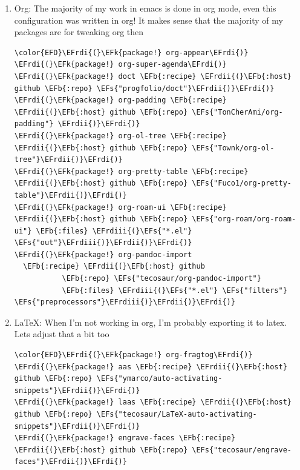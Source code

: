 \documentclass{scrartcl}
\newcommand{\EFk}[1]{\textcolor{EFk}{#1}} %
\newcommand{\EFs}[1]{\textcolor{EFs}{#1}} %
\newcommand{\EFb}[1]{\textcolor{EFb}{#1}} %
\newcommand{\EFrdi}[1]{\textcolor{EFrdi}{#1}} %
\newcommand{\EFrdii}[1]{\textcolor{EFrdii}{#1}} %
\newcommand{\EFrdiii}[1]{\textcolor{EFrdiii}{#1}} %
\begin{document}
\begin{enumerate}
\item Org:
\label{sec:orge8de331}
The majority of my work in emacs is done in org mode, even this configuration
was written in org! It makes sense that the majority of my packages are for
tweaking org then
\begin{Code}
\begin{Verbatim}[]
\color{EFD}\EFrdi{(}\EFk{package!} org-appear\EFrdi{)}
\EFrdi{(}\EFk{package!} org-super-agenda\EFrdi{)}
\EFrdi{(}\EFk{package!} doct \EFb{:recipe} \EFrdii{(}\EFb{:host} github \EFb{:repo} \EFs{"progfolio/doct"}\EFrdii{)}\EFrdi{)}
\EFrdi{(}\EFk{package!} org-padding \EFb{:recipe} \EFrdii{(}\EFb{:host} github \EFb{:repo} \EFs{"TonCherAmi/org-padding"} \EFrdii{)}\EFrdi{)}
\EFrdi{(}\EFk{package!} org-ol-tree \EFb{:recipe} \EFrdii{(}\EFb{:host} github \EFb{:repo} \EFs{"Townk/org-ol-tree"}\EFrdii{)}\EFrdi{)}
\EFrdi{(}\EFk{package!} org-pretty-table \EFb{:recipe} \EFrdii{(}\EFb{:host} github \EFb{:repo} \EFs{"Fuco1/org-pretty-table"}\EFrdii{)}\EFrdi{)}
\EFrdi{(}\EFk{package!} org-roam-ui \EFb{:recipe} \EFrdii{(}\EFb{:host} github \EFb{:repo} \EFs{"org-roam/org-roam-ui"} \EFb{:files} \EFrdiii{(}\EFs{"*.el"} \EFs{"out"}\EFrdiii{)}\EFrdii{)}\EFrdi{)}
\EFrdi{(}\EFk{package!} org-pandoc-import
  \EFb{:recipe} \EFrdii{(}\EFb{:host} github
           \EFb{:repo} \EFs{"tecosaur/org-pandoc-import"}
           \EFb{:files} \EFrdiii{(}\EFs{"*.el"} \EFs{"filters"} \EFs{"preprocessors"}\EFrdiii{)}\EFrdii{)}\EFrdi{)}
\end{Verbatim}
\end{Code}

\item \LaTeX:
\label{sec:org65a874d}
When I'm not working in org, I'm probably exporting it to latex. Lets adjust
that a bit too
\begin{Code}
\begin{Verbatim}[]
\color{EFD}\EFrdi{(}\EFk{package!} org-fragtog\EFrdi{)}
\EFrdi{(}\EFk{package!} aas \EFb{:recipe} \EFrdii{(}\EFb{:host} github \EFb{:repo} \EFs{"ymarco/auto-activating-snippets"}\EFrdii{)}\EFrdi{)}
\EFrdi{(}\EFk{package!} laas \EFb{:recipe} \EFrdii{(}\EFb{:host} github \EFb{:repo} \EFs{"tecosaur/LaTeX-auto-activating-snippets"}\EFrdii{)}\EFrdi{)}
\EFrdi{(}\EFk{package!} engrave-faces \EFb{:recipe} \EFrdii{(}\EFb{:host} github \EFb{:repo} \EFs{"tecosaur/engrave-faces"}\EFrdii{)}\EFrdi{)}
\end{Verbatim}
\end{Code}


\end{enumerate}
\end{document}
